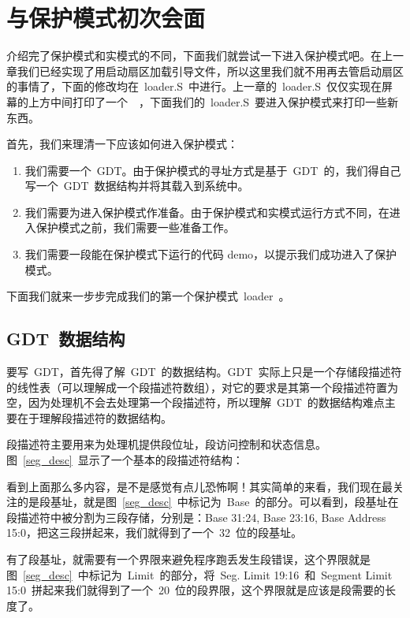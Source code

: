 \section{与保护模式初次会面}

介绍完了保护模式和实模式的不同，下面我们就尝试一下进入保护模式吧。在上一章我们已经实现了用启动扇区加载引导文件，所以这里我们就不用再去管启动扇区的事情了，下面的修改均在~loader.S~中进行。上一章的~loader.S~仅仅实现在屏幕的上方中间打印了一个~~，下面我们的~loader.S~要进入保护模式来打印一些新东西。

首先，我们来理清一下应该如何进入保护模式：

\begin{enumerate}
  \item 我们需要一个~GDT。由于保护模式的寻址方式是基于~GDT~的，我们得自己写一个~GDT~数据结构并将其载入到系统中。
  \item 我们需要为进入保护模式作准备。由于保护模式和实模式运行方式不同，在进入保护模式之前，我们需要一些准备工作。
  \item 我们需要一段能在保护模式下运行的代码 demo，以提示我们成功进入了保护模式。
\end{enumerate}

下面我们就来一步步完成我们的第一个保护模式~loader~。

\subsection{GDT~数据结构}

要写~GDT，首先得了解~GDT~的数据结构。GDT~实际上只是一个存储段描述符的线性表（可以理解成一个段描述符数组），对它的要求是其第一个段描述符置为空，因为处理机不会去处理第一个段描述符，所以理解~GDT~的数据结构难点主要在于理解段描述符的数据结构。

段描述符主要用来为处理机提供段位址，段访问控制和状态信息。图~\ref{seg_desc}~显示了一个基本的段描述符结构：


看到上面那么多内容，是不是感觉有点儿恐怖啊！其实简单的来看，我们现在最关注的是段基址，就是图~\ref{seg_desc}~中标记为~Base~的部分。可以看到，段基址在段描述符中被分割为三段存储，分别是：Base 31:24, Base 23:16, Base Address 15:0，把这三段拼起来，我们就得到了一个~32~位的段基址。

有了段基址，就需要有一个界限来避免程序跑丢发生段错误，这个界限就是图~\ref{seg_desc}~中标记为~Limit~的部分，将~Seg. Limit 19:16~和~Segment Limit 15:0~拼起来我们就得到了一个~20~位的段界限，这个界限就是应该是段需要的长度了。

